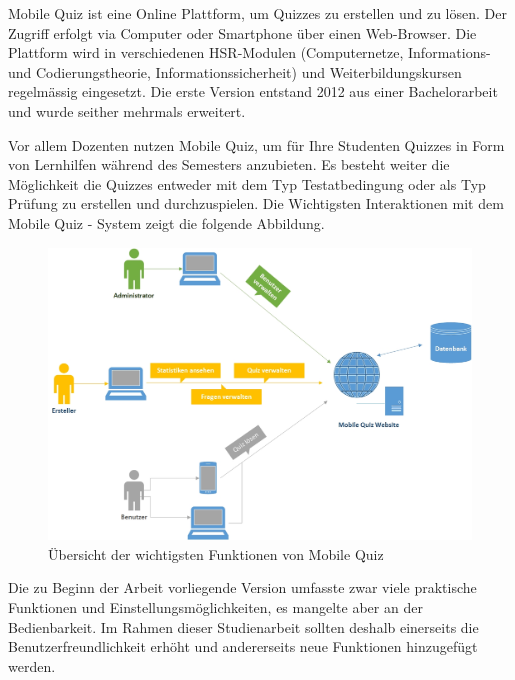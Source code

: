
Mobile Quiz ist eine Online Plattform, um Quizzes zu erstellen und zu lösen. Der Zugriff erfolgt via Computer oder Smartphone über einen Web-Browser. Die Plattform wird in verschiedenen HSR-Modulen (Computernetze, Informations- und Codierungstheorie, Informationssicherheit) und Weiterbildungskursen regelmässig eingesetzt. Die erste Version entstand 2012 aus einer Bachelorarbeit und wurde seither mehrmals erweitert. 

\bigskip

Vor allem Dozenten nutzen Mobile Quiz, um für Ihre Studenten Quizzes in Form von Lernhilfen während des Semesters anzubieten. Es besteht weiter die Möglichkeit die Quizzes entweder mit dem Typ Testatbedingung oder als Typ Prüfung zu erstellen und durchzuspielen. Die Wichtigsten Interaktionen mit dem Mobile Quiz - System zeigt die folgende Abbildung.

\begin{figure}[H]
	\centering
	\includegraphics[width=1\textwidth]
	{Images/InteraktionMobileQuiz.jpg}
	\caption{Übersicht der wichtigsten Funktionen von Mobile Quiz}
\end{figure}

\bigskip
Die zu Beginn der Arbeit vorliegende Version umfasste zwar viele praktische Funktionen und Einstellungsmöglichkeiten, es mangelte aber an der Bedienbarkeit. Im Rahmen dieser Studienarbeit sollten deshalb einerseits die Benutzerfreundlichkeit erhöht und andererseits neue Funktionen hinzugefügt werden.

\bigskip

